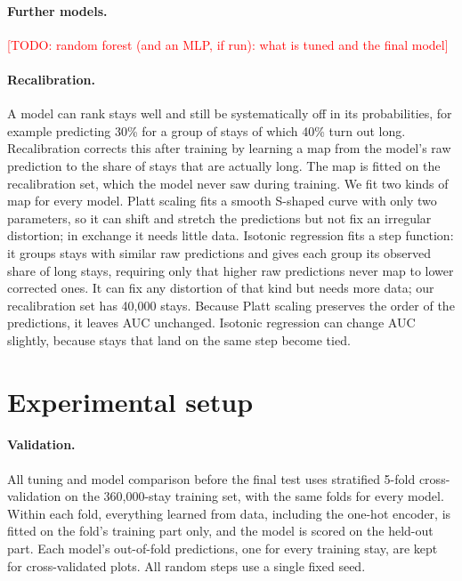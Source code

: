\documentclass{article}
\newcommand{\todo}[1]{\textcolor{red}{[TODO: #1]}}
\begin{document}
\paragraph{Further models.}
\todo{random forest (and an MLP, if run): what is tuned and the final model}

\paragraph{Recalibration.}
A model can rank stays well and still be systematically off in its
probabilities, for example predicting 30\% for a group of stays of which 40\%
turn out long. Recalibration corrects this after training by learning a map
from the model's raw prediction to the share of stays that are actually long.
The map is fitted on the recalibration set, which the model never saw during
training. We fit two kinds of map for every model. Platt scaling fits a
smooth S-shaped curve with only two parameters, so it can shift and stretch
the predictions but not fix an irregular distortion; in exchange it needs
little data. Isotonic regression fits a step function: it groups stays with
similar raw predictions and gives each group its observed share of long
stays, requiring only that higher raw predictions never map to lower
corrected ones. It can fix any distortion of that kind but needs more data;
our recalibration set has 40{,}000 stays.
Because Platt scaling preserves the order of the predictions, it leaves AUC
unchanged. Isotonic regression can change AUC slightly, because stays that
land on the same step become tied.

\section{Experimental setup}
\label{sec:setup}

\paragraph{Validation.}
All tuning and model comparison before the final test uses stratified 5-fold
cross-validation on the 360{,}000-stay training set, with the same folds for
every model. Within each fold, everything learned from data, including the
one-hot encoder, is fitted on the fold's training part only, and the model is
scored on the held-out part. Each
model's out-of-fold predictions, one for every training stay, are kept for
cross-validated plots. All random steps use a single fixed seed.
\end{document}
